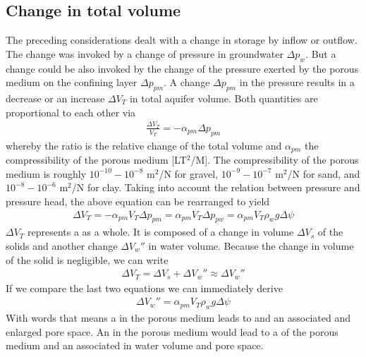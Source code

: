 \documentclass[letterpaper,10pt,english]{sphinxmanual}
\begin{document}
\subsection{Change in total volume}
\label{\detokenize{contents/flow/lecture_03/13_gw_storage:change-in-total-volume}}
The preceding considerations dealt with a change in storage by inflow or outflow. The change was invoked by a change of pressure in groundwater \(\Delta p_w\). But a change could be also invoked by the change of the pressure exerted by the porous medium on the confining layer \(\Delta p_{pm}\). A change \(\Delta p_{pm}\) in the pressure results in a decrease or an increase \(\Delta V_T\) in total aquifer volume. Both quantities are proportional to each other via
\begin{equation*}
\begin{split}
\frac{\Delta V_T}{V_T} = - \alpha_{pm} \Delta p_{pm}
\end{split}
\end{equation*}
whereby the ratio is the relative change of the total volume and \(\alpha_{pm}\) the compressibility of the porous medium {[}LT\(^2\)/M{]}. The compressibility of the porous medium is roughly \(10^{-10} - 10^{-8}\) m\(^2\)/N for gravel,
\(10^{-9} -  10^{-7}\) m\(^2\)/N for sand, and \(10^{-8} - 10^{-6}\) m\(^2\)/N for clay. Taking into account the relation between pressure and pressure head, the above equation can be rearranged to yield
\begin{equation*}
\begin{split}
\Delta V_T = -\alpha_{pm}V_T\Delta p_{pm} = \alpha_{pm}V_T\Delta p_{pw} = \alpha_{pm}V_T\rho_w g \Delta \psi
\end{split}
\end{equation*}
\(\Delta V_T\) represents a  as a whole. It is composed of a change in volume \(\Delta V_s\) of the solids and another change \(\Delta V_w''\) in water volume. Because the change in volume of the solid is negligible, we can write
\begin{equation*}
\begin{split}
\Delta V_T = \Delta V_s + \Delta V_w'' \approx \Delta V_w''
\end{split}
\end{equation*}
If we compare the last two equations we can immediately derive
\begin{equation*}
\begin{split}
\Delta V_w'' = \alpha_{pm} V_T\rho_w g \Delta\psi
\end{split}
\end{equation*}
With words that means a  in the porous medium leads to  and an associated  and enlarged pore space. An  in the porous medium would lead to a  of the porous medium and an associated  in water volume and  pore space.
\end{document}
